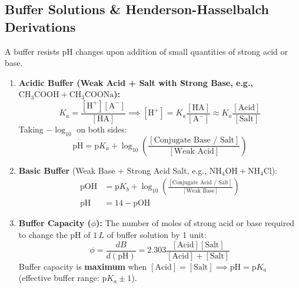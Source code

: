 \documentclass[10pt,twoside,openright]{book}
\begin{document}
\subsection{Buffer Solutions \& Henderson-Hasselbalch Derivations}
A buffer resists pH changes upon addition of small quantities of strong acid or base.
\begin{enumerate}
  \item \textbf{Acidic Buffer (Weak Acid + Salt with Strong Base, e.g., $\mathrm{CH_3COOH + CH_3COONa}$):}
  \begin{equation}
    K_a = \frac{[\mathrm{H}^+][\mathrm{A}^-]}{[\mathrm{HA}]} \implies [\mathrm{H}^+] = K_a \frac{[\mathrm{HA}]}{[\mathrm{A}^-]} \approx K_a \frac{[\text{Acid}]}{[\text{Salt}]}
  \end{equation}
  Taking $-\log_{10}$ on both sides:
  \begin{equation}
    \text{pH} = \text{p}K_a + \log_{10}\left(\frac{[\text{Conjugate Base / Salt}]}{[\text{Weak Acid}]}\right)
  \end{equation}
  \item \textbf{Basic Buffer} (Weak Base + Strong Acid Salt, e.g., $\mathrm{NH_4OH + NH_4Cl}$):
  \begin{align}
    \text{pOH} &= \text{p}K_b + \log_{10}\left(\frac{[\text{Conjugate Acid / Salt}]}{[\text{Weak Base}]}\right) \\
    \text{pH} &= 14 - \text{pOH}
  \end{align}
  \item \textbf{Buffer Capacity ($\phi$):} The number of moles of strong acid or base required to change the pH of $1\,\si{L}$ of buffer solution by 1 unit:
  \begin{equation}
    \phi = \frac{d B}{d(\text{pH})} = 2.303 \frac{[\text{Acid}][\text{Salt}]}{[\text{Acid}] + [\text{Salt}]}
  \end{equation}
  Buffer capacity is \textbf{maximum} when $[\text{Acid}] = [\text{Salt}] \implies \text{pH} = \text{p}K_a$ (effective buffer range: $\text{p}K_a \pm 1$).
\end{enumerate}
\end{document}
